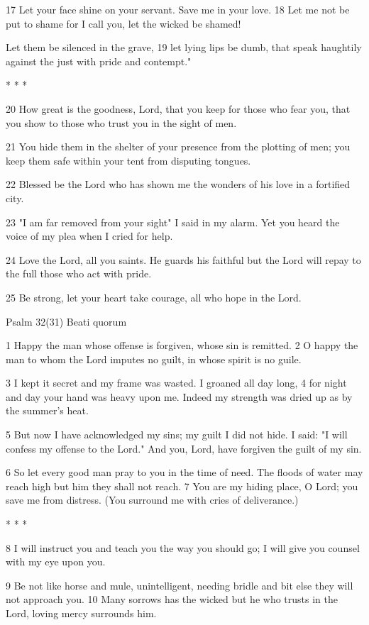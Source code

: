 17 Let your face shine on your servant.
Save me in your love.
18 Let me not be put to shame for I call you,
let the wicked be shamed!

Let them be silenced in the grave,
19 let lying lips be dumb,
that speak haughtily against the just
with pride and contempt."

* * *

20 How great is the goodness, Lord,
that you keep for those who fear you,
that you show to those who trust you
in the sight of men.

21 You hide them in the shelter of your presence
from the plotting of men;
you keep them safe within your tent
from disputing tongues.

22 Blessed be the Lord who has shown me
the wonders of his love
in a fortified city.

23 "I am far removed from your sight"
I said in my alarm.
Yet you heard the voice of my plea
when I cried for help.

24 Love the Lord, all you saints.
He guards his faithful
but the Lord will repay to the full
those who act with pride.

25 Be strong, let your heart take courage,
all who hope in the Lord.


Psalm 32(31) Beati quorum

1 Happy the man whose offense is forgiven,
whose sin is remitted.
2 O happy the man to whom the Lord
imputes no guilt,
in whose spirit is no guile.

3 I kept it secret and my frame was wasted.
I groaned all day long,
4 for night and day your hand was heavy upon me.
Indeed my strength was dried up
as by the summer's heat.

5 But now I have acknowledged my sins;
my guilt I did not hide.
I said: "I will confess
my offense to the Lord."
And you, Lord, have forgiven
the guilt of my sin.

6 So let every good man pray to you
in the time of need.
The floods of water may reach high
but him they shall not reach.
7 You are my hiding place, O Lord;
you save me from distress.
(You surround me with cries of deliverance.)

* * *

8 I will instruct you and teach you
the way you should go;
I will give you counsel
with my eye upon you.

9 Be not like horse and mule, unintelligent,
needing bridle and bit
else they will not approach you.
10 Many sorrows has the wicked
but he who trusts in the Lord,
loving mercy surrounds him.


